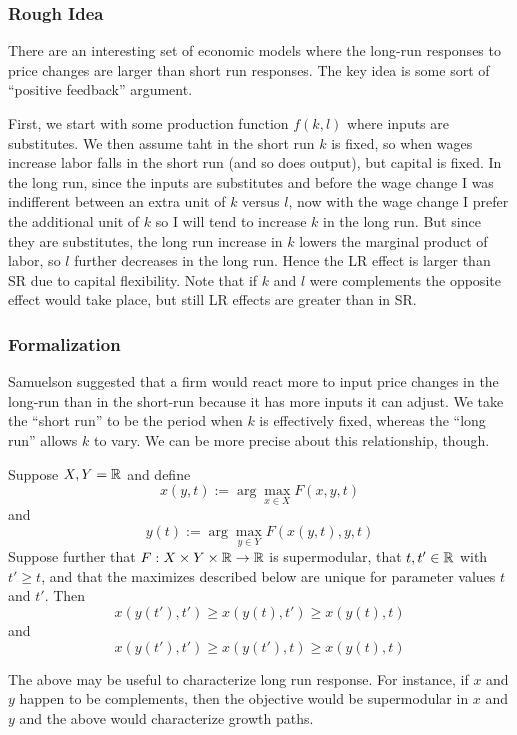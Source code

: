 \subsubsection{Rough Idea}

There are an interesting set of economic models where the long-run
responses to price changes are larger than short run responses. The
key idea is some sort of ``positive feedback'' argument.

First, we start with some production function $f(k, l)$ where inputs
are substitutes. We then assume taht in the short run $k$ is fixed, so
when wages increase labor falls in the short run (and so does output),
but capital is fixed. In the long run, since the inputs are
substitutes and before the wage change I was indifferent between an
extra unit of $k$ versus $l$, now with the wage change I prefer the
additional unit of $k$ so I will tend to increase $k$ in the long
run. But since they are substitutes, the long run increase in $k$
lowers the marginal product of labor, so $l$ further decreases in the
long run. Hence the LR effect is larger than SR due to capital
flexibility. Note that if $k$ and $l$ were complements the opposite
effect would take place, but still LR effects are greater than in SR.


\subsubsection{Formalization}



Samuelson suggested that a firm would react more to input price
changes in the long-run than in the short-run because it has more
inputs it can adjust. We take the ``short run'' to be the period when
$k$ is effectively fixed, whereas the ``long run'' allows $k$ to
vary. We can be more precise about this relationship, though.

\begin{prop}
  Suppose $X, Y = {\mathbb R}$ and define
  \[
  x(y, t) := \arg \max_{x \in X} F(x,y,t)
  \]
  and
  \[
  y(t) := \arg \max_{y \in Y} F(x(y, t), y, t)
  \]
  Suppose further that $F: X \times Y \times {\mathbb R} \to {\mathbb R}$ is
  supermodular, that $t, t' \in {\mathbb R} $ with $t' \geq t$, and that the
  maximizes described below are unique for parameter values $t$ and
  $t'$. Then
  \[
  x(y(t'), t') \geq x(y(t), t') \geq x(y(t), t)
  \]
  and
  \[
  x(y(t'), t') \geq x(y(t'), t) \geq x(y(t), t)
  \]
\end{prop}

The above may be useful to characterize long run response. For
instance, if $x$ and $y$ happen to be complements, then the objective
would be supermodular in $x$ and $y$ and the above would characterize
growth paths.

